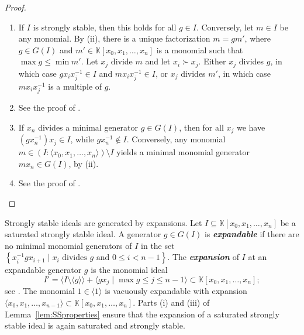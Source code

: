 \documentclass[12pt]{amsart}%
\theoremstyle{definition}%
\newcommand{\kk}{\mathbb{K}}%
\DeclareMathOperator{\lexg}{\succ}%
\begin{document}
\begin{proof} $\;$
  \begin{enumerate}
  \item If $I$ is strongly stable, then this holds for all $g \in I$.
    Conversely, let $m \in I$ be any monomial.  By (ii), there is a
    unique factorization $m = g m'$, where $g \in G(I)$ and $m' \in
    \kk[x_0, x_1, \dotsc, x_n]$ is a monomial such that $\max g \le
    \min m'$.  Let $x_j$ divide $m$ and let $x_i \lexg x_j$.  Either
    $x_j$ divides $g$, in which case $g x_i x_j^{-1} \in I$ and $m x_i
    x_j^{-1} \in I$, or $x_j$ divides $m'$, in which case $m x_i
    x_j^{-1}$ is a multiple of $g$.

  \item See the proof of \cite[Lemma~2.11]{Miller--Sturmfels--2005}.

  \item If $x_n$ divides a minimal generator $g \in G(I)$, then for
    all $x_j$ we have $(g x_n^{-1}) x_j \in I$, while $g x_n^{-1}
    \notin I$.  Conversely, any monomial $m \in (I : \langle x_0, x_1,
    \dotsc, x_{n} \rangle) \setminus I$ yields a minimal monomial
    generator $m x_n \in G(I)$, by (ii).
  
  \item See the proof of \cite[Lemma~3.17]{Moore--2012}.  \qedhere
  \end{enumerate}
\end{proof}

Strongly stable ideals are generated by expansions.  Let $I \subseteq
\kk[x_0, x_1, \dotsc, x_n]$ be a saturated strongly stable ideal.  A
generator $g \in G(I)$ is \emph{\bfseries expandable} if there are no
minimal monomial generators of $I$ in the set $\left\{ x_i^{-1} g
x_{i+1} \mid x_i \text{ divides } g \text{ and } 0 \le i < n-1
\right\}$.  The \emph{\bfseries expansion} of $I$ at an expandable
generator $g$ is the monomial ideal
\[ 
I' = \langle I \setminus \langle g \rangle \rangle + \langle g x_{j}
\mid \max g \le j \le n-1 \rangle \subset \kk[x_0, x_1, \dotsc, x_n] ;
\]
see \cite[Definition~3.4]{Moore--2012}.  The monomial $1 \in \langle 1
\rangle$ is vacuously expandable with expansion $\langle x_0, x_1,
\dotsc, x_{n-1} \rangle \subset \kk[x_0, x_1, \dotsc, x_{n}]$. Parts
(i) and (iii) of Lemma~\ref{lem:SSproperties} ensure that the
expansion of a saturated strongly stable ideal is again saturated and
strongly stable.
\end{document}
